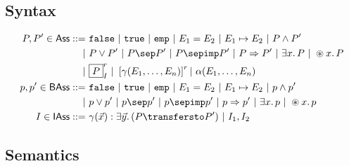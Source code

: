 \subsection{Syntax}

\begin{align*}
P, P' \in \mathsf{Ass} ::=&
\ \mathtt{false}\
|\ \mathtt{true}\
|\ \mathtt{emp}\
|\ E_1 = E_2\
|\ E_1 \mapsto E_2\
|\ P \land P' \\
|&\ P \lor P'\
|\ P \sep P'\
|\ P \sepimp P'\
|\ P \Rightarrow P'\
|\ \exists x \ldotp P\
|\ \circledast x \ldotp P \\
|&\ \boxed{P}^r_I\
|\ \left[ \gamma(E_1, \ldots, E_n) \right]^r
|\ \alpha(E_1, \ldots, E_n) \\
p, p' \in \mathsf{BAss} ::=&
\ \mathtt{false}\
|\ \mathtt{true}\
|\ \mathtt{emp}\
|\ E_1 = E_2\
|\ E_1 \mapsto E_2\
|\ p \land p' \\
|&\ p \lor p'\
|\ p \sep p'\
|\ p \sepimp p'\
|\ p \Rightarrow p'\
|\ \exists x \ldotp p\
|\ \circledast x \ldotp p \\
I \in \mathsf{IAss} ::=&
\ \gamma(\vec{x}): \exists \vec{y} \ldotp (P \transfersto P')\ |\ I_1, I_2 \\
\end{align*}

\subsection{Semantics}

